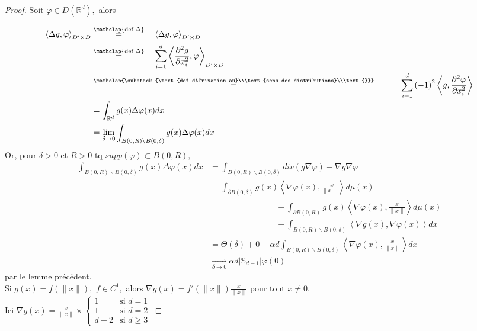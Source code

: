 \begin{proof}
Soit $\varphi \in D(\mathbb{R} ^d),$ alors

\begin{align*}
    \left<\Delta g,\varphi  \right>_{D'\times D}&\overset{\mathclap{\text{def }\Delta}}{=}\hspace{1em}\left<\Delta g,\varphi  \right>_{D'\times D}\\
    &\overset{\mathclap{\text{def }\Delta}}{=}\hspace{1em}\sum\limits_{i=1}^{d} \left<\frac{\partial^2g}{\partial x_i^2}, \varphi  \right>_{D'\times D}\\
    &\overset{\mathclap{\substack{\text{def dérivation au}\\\text{sens des distributions}\\\text{}}}}{=}\hspace{3em}\sum\limits_{i=1}^{d} \left( -1 \right) ^2\left<g, \frac{\partial^2 \varphi }{\partial x_i^2} \right> \\
    &= \int_{\mathbb{R} ^d}g(x)\Delta \varphi (x)dx\\
    &=\lim\limits_{\delta \to 0} \int_{B(0,R) \backslash B(0,\delta)}g(x)\Delta \varphi (x)dx
\end{align*}
    Or, pour $\delta>0$ et $R>0$ tq $supp(\varphi )\subset B(0,R),$
    \begin{align*}
        \int_{B(0,R) \backslash B(0,\delta)}g(x)\Delta \varphi (x)dx &= \int_{B(0,R) \backslash B(0,\delta)}div\left( g \nabla \varphi  \right) -\nabla g\nabla \varphi \\
            &= \int_{\partial B(0,\delta)} g(x)\left<\nabla \varphi (x), \frac{-x}{\|x\|} \right>d\mu(x)\\
            &\hspace{8em}+\int_{\partial B(0,R)}g(x)\left<\nabla \varphi (x), \frac{x}{\|x\|} \right>d\mu(x) \\
            &\hspace{8em}+ \int_{B(0,R) \backslash B(0,\delta)}\left<\nabla g(x),\nabla \varphi (x) \right>dx\\
            &= \Theta(\delta) + 0 - \alpha d \int_{B(0,R) \backslash B(0,\delta)}  \left<\nabla \varphi (x),\frac{x}{\|x\|} \right>dx\\
            &\underset{\delta\to 0}{\longrightarrow} \alpha d|\mathbb{S}_{d-1}| \varphi (0)
    \end{align*}
    par le lemme précédent.\\
    Si $g(x)=f(\|x\|),$ $f\in C^1,$ alors $\nabla g(x)=f'(\|x\|)\frac{x}{\|x\|}$ pour tout $x\neq 0$. \\
    Ici $\nabla g(x)=\frac{x}{\|x\|}\times
    \begin{cases}
        1 &\text{si }d=1\\
        1 &\text{si }d=2\\
        d-2 &\text{si }d\ge 3
    \end{cases}$
\end{proof}
